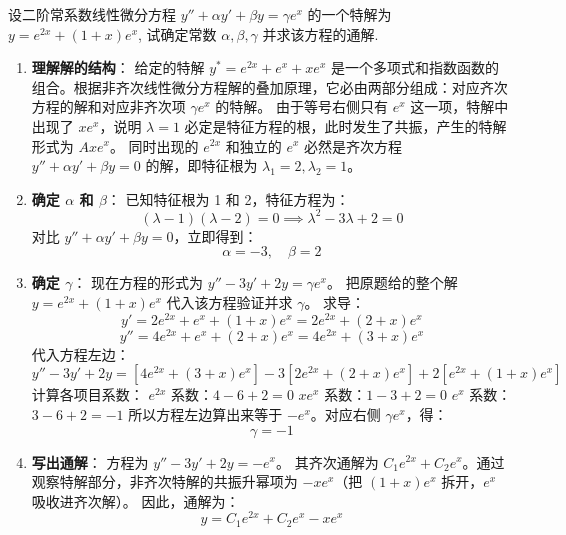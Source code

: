 \documentclass[lang=cn,11pt]{elegantbook}
\begin{document}
\begin{exercise}[常系数线性非齐次方程的特解与通解]
设二阶常系数线性微分方程 $y''+\alpha y'+\beta y=\gamma e^x$ 的一个特解为 $y=e^{2x}+(1+x)e^x$, 试确定常数 $\alpha, \beta, \gamma$ 并求该方程的通解. 
\end{exercise}
\begin{solution}
\begin{enumerate}
    \item \textbf{理解解的结构}：
    给定的特解 $y^* = e^{2x} + e^x + x e^x$ 是一个多项式和指数函数的组合。根据非齐次线性微分方程解的叠加原理，它必由两部分组成：对应齐次方程的解和对应非齐次项 $\gamma e^x$ 的特解。
    由于等号右侧只有 $e^x$ 这一项，特解中出现了 $x e^x$，说明 $\lambda=1$ 必定是特征方程的根，此时发生了共振，产生的特解形式为 $A x e^x$。
    同时出现的 $e^{2x}$ 和独立的 $e^x$ 必然是齐次方程 $y''+\alpha y'+\beta y=0$ 的解，即特征根为 $\lambda_1=2, \lambda_2=1$。
    
    \item \textbf{确定 $\alpha$ 和 $\beta$}：
    已知特征根为 1 和 2，特征方程为：
    \[
    (\lambda-1)(\lambda-2) = 0 \implies \lambda^2 - 3\lambda + 2 = 0
    \]
    对比 $y''+\alpha y'+\beta y=0$，立即得到：
    \[
    \alpha = -3, \quad \beta = 2
    \]
    
    \item \textbf{确定 $\gamma$}：
    现在方程的形式为 $y'' - 3y' + 2y = \gamma e^x$。
    把原题给的整个解 $y = e^{2x} + (1+x)e^x$ 代入该方程验证并求 $\gamma$。
    求导：
    \[
    y' = 2e^{2x} + e^x + (1+x)e^x = 2e^{2x} + (2+x)e^x
    \]
    \[
    y'' = 4e^{2x} + e^x + (2+x)e^x = 4e^{2x} + (3+x)e^x
    \]
    代入方程左边：
    \[
    y'' - 3y' + 2y = [4e^{2x} + (3+x)e^x] - 3[2e^{2x} + (2+x)e^x] + 2[e^{2x} + (1+x)e^x]
    \]
    计算各项目系数：
    $e^{2x}$ 系数：$4 - 6 + 2 = 0$
    $x e^x$ 系数：$1 - 3 + 2 = 0$
    $e^x$ 系数：$3 - 6 + 2 = -1$
    所以方程左边算出来等于 $-e^x$。对应右侧 $\gamma e^x$，得：
    \[
    \gamma = -1
    \]
    
    \item \textbf{写出通解}：
    方程为 $y'' - 3y' + 2y = -e^x$。
    其齐次通解为 $C_1 e^{2x} + C_2 e^x$。通过观察特解部分，非齐次特解的共振升幂项为 $-x e^x$（把 $(1+x)e^x$ 拆开，$e^x$ 吸收进齐次解）。
    因此，通解为：
    \[
    y = C_1 e^{2x} + C_2 e^x - x e^x
    \]
\end{enumerate}
\end{solution}
\end{document}
